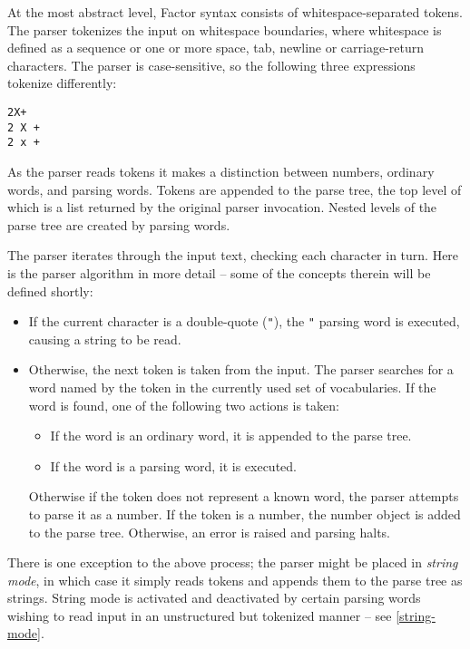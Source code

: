 \documentclass{book}
\begin{document}
At the most abstract level,
Factor syntax consists of whitespace-separated tokens. The parser tokenizes the input on whitespace boundaries, where whitespace is defined as a sequence or one or more space, tab, newline or carriage-return characters.  The parser is case-sensitive, so
the following three expressions tokenize differently:
\begin{verbatim}
2X+
2 X +
2 x +
\end{verbatim}
As the parser reads tokens it makes a distinction between numbers, ordinary words, and
parsing words. Tokens are appended to the parse tree, the top level of which is a list
returned by the original parser invocation. Nested levels of the parse tree are created
by parsing words.

The parser iterates through the input text, checking each character in turn. Here is the parser algorithm in more detail -- some of the concepts therein will be defined shortly:

\begin{itemize}
\item If the current character is a double-quote (\texttt{"}), the \texttt{"} parsing word is executed, causing a string to be read.
\item Otherwise, the next token is taken from the input. The parser searches for a word named by the token in the currently used set of vocabularies. If the word is found, one of the following two actions is taken:
\begin{itemize}
\item If the word is an ordinary word, it is appended to the parse tree.
\item If the word is a parsing word, it is executed.
\end{itemize}
Otherwise if the token does not represent a known word, the parser attempts to parse it as a number. If the token is a number, the number object is added to the parse tree. Otherwise, an error is raised and parsing halts.
\end{itemize}

\newcommand{\stringmodeglos}{
}
\stringmodeglos

There is one exception to the above process; the parser might be placed in \emph{string mode}, in which case it simply reads tokens and appends them to the parse tree as strings. String mode is activated and deactivated by certain parsing words wishing to read input in an unstructured but tokenized manner -- see \ref{string-mode}.
\end{document}
